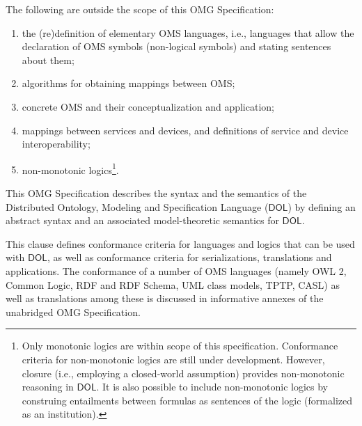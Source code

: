 \documentclass[10pt, a4paper]{isov2}
\makeatletter
\def\cleardoublepage{\clearpage%
        \if@twoside
            \ifodd\c@page\else
                \vspace*{\fill}
                \hfill
                \begin{center}
					
                \end{center}
                \vspace{\fill}
                \thispagestyle{empty}
                \newpage
                \if@twocolumn\hbox{}\newpage\fi
            \fi
        \fi
    }
\newcommand*\CommentAuthor{}
\renewcommand*\CommentAuthor{#1}}
\newcommand*\CommentDate{}
\renewcommand*\CommentDate{#1}}
\newcommand*\CommentId{}
\renewcommand*\CommentId{#1}}
\newcommand*\CommentType{}
\renewcommand*\CommentType{#1}}
\newcommand*{\SetCommentColorByType}[1]{%
\edef\localType{{#1}}%
\expandafter\ifstrequal\localType{q-aut}{\colorlet{CommentColor}{red}}{%
\expandafter\ifstrequal\localType{q-all}{\colorlet{CommentColor}{orange}}{%
\expandafter\ifstrequal\localType{todo}{\colorlet{CommentColor}{orange}}{%
\expandafter\ifstrequal\localType{fyi}{\colorlet{CommentColor}{lightgray}}{%
\colorlet{CommentColor}{yellow}}}}}}
\newcommand*{\SetCommentPrefixByType}[1]{%
\edef\localType{{#1}}%
\expandafter\@ifmtarg\localType{%
\edef\CommentPrefix{}%
}{%
\caseupper[q]{#1}%
\edef\CommentPrefix{\thestring: }%
}}
\newcommand*{\initComment}[1]{%
\setkeys{Comment}{#1}%
\SetCommentColorByType{\CommentType}%
\relax%
\SetCommentPrefixByType{\CommentType}%
\relax%
}
\newcommand*{\todonote}[2][]{%
\initComment{#1}%
\pdfcomment[author=\CommentAuthor,color=CommentColor,date=\CommentDate,id=\CommentId]{%
\CommentPrefix
#2}}
\renewcommand*{\todonote}[2][]{%
\initComment{#1}%
\ednote{\CommentPrefix #2}}
\newcommand*{\IS}{OMG Specification\xspace}
\newcommand*{\DOL}{\ensuremath{\mathsf{DOL}}\xspace}
\makeatother
\begin{document}
The following are outside the scope of this \IS:
\begin{enumerate}
\item the (re)definition of elementary OMS languages, i.e., languages that allow the declaration of OMS symbols (non-logical symbols)
and
stating sentences about them;
\item algorithms for obtaining mappings between OMS;
\item concrete OMS and their conceptualization and application;
\item mappings between services and devices, and definitions of service and device interoperability;
\item non-monotonic logics\footnote{Only monotonic logics are within scope of this specification. Conformance criteria for non-monotonic logics are still under development. However, closure (i.e., employing a closed-world assumption) provides non-monotonic reasoning in \DOL. It is also possible to include non-monotonic logics by construing entailments between formulas as sentences of the logic (formalized as an institution).}.

\end{enumerate}

This \IS describes the syntax and the semantics of the Distributed Ontology, Modeling and
Specification Language (\DOL) by defining an abstract syntax and an associated model-theoretic
semantics for \DOL.


\newpage
{}\label{c:conformance}
This clause defines conformance criteria for languages and logics that can be used with \DOL, as well as conformance criteria for
serializations, translations and applications. The conformance of a
number of OMS languages (namely OWL 2, Common Logic, RDF and RDF Schema,
UML class models, TPTP, CASL) as well as translations among
these is discussed in informative annexes of the unabridged \IS.
\end{document}
